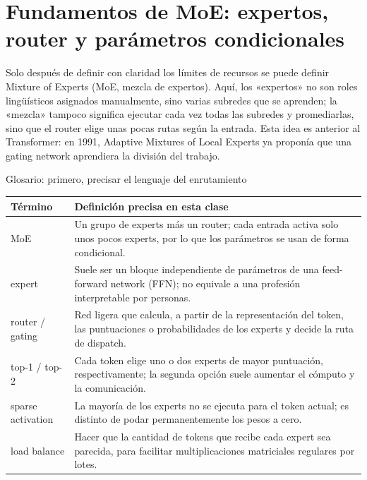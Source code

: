 \section{Fundamentos de MoE: expertos, router y parámetros condicionales}

Solo después de definir con claridad los límites de recursos se puede definir Mixture of Experts (MoE, mezcla de expertos). Aquí, los «expertos» no son roles lingüísticos asignados manualmente, sino varias subredes que se aprenden; la «mezcla» tampoco significa ejecutar cada vez todas las subredes y promediarlas, sino que el router elige unas pocas rutas según la entrada. Esta idea es anterior al Transformer: en 1991, Adaptive Mixtures of Local Experts ya proponía que una gating network aprendiera la división del trabajo.


\begin{knowledgebox}{Glosario: primero, precisar el lenguaje del enrutamiento}
\begin{tabularx}{\textwidth}{L{0.22\textwidth}X}
\toprule
Término & Definición precisa en esta clase \\
\midrule
MoE & Un grupo de experts más un router; cada entrada activa solo unos pocos experts, por lo que los parámetros se usan de forma condicional. \\
expert & Suele ser un bloque independiente de parámetros de una feed-forward network (FFN); no equivale a una profesión interpretable por personas. \\
router / gating & Red ligera que calcula, a partir de la representación del token, las puntuaciones o probabilidades de los experts y decide la ruta de dispatch. \\
top-1 / top-2 & Cada token elige uno o dos experts de mayor puntuación, respectivamente; la segunda opción suele aumentar el cómputo y la comunicación. \\
sparse activation & La mayoría de los experts no se ejecuta para el token actual; es distinto de podar permanentemente los pesos a cero. \\
load balance & Hacer que la cantidad de tokens que recibe cada expert sea parecida, para facilitar multiplicaciones matriciales regulares por lotes. \\
\bottomrule
\end{tabularx}
\end{knowledgebox}

